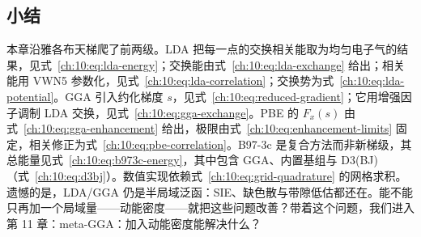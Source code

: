 \subsection*{小结}
本章沿雅各布天梯爬了前两级。LDA 把每一点的交换相关能取为均匀电子气的结果，见式~\eqref{ch:10:eq:lda-energy}；交换能由式~\eqref{ch:10:eq:lda-exchange} 给出；相关能用 VWN5 参数化，见式~\eqref{ch:10:eq:lda-correlation}；交换势为式~\eqref{ch:10:eq:lda-potential}。GGA 引入约化梯度 $s$，见式~\eqref{ch:10:eq:reduced-gradient}；它用增强因子调制 LDA 交换，见式~\eqref{ch:10:eq:gga-exchange}。PBE 的 $F_x(s)$ 由式~\eqref{ch:10:eq:gga-enhancement} 给出，极限由式~\eqref{ch:10:eq:enhancement-limits} 固定，相关修正为式~\eqref{ch:10:eq:pbe-correlation}。B97-3c 是复合方法而非新梯级，其总能量见式~\eqref{ch:10:eq:b973c-energy}，其中包含 GGA、内置基组与 D3(BJ)（式~\eqref{ch:10:eq:d3bj}）。数值实现依赖式~\eqref{ch:10:eq:grid-quadrature} 的网格求积。遗憾的是，LDA/GGA 仍是半局域泛函：SIE、缺色散与带隙低估都还在。能不能只再加一个局域量——动能密度——就把这些问题改善？带着这个问题，我们进入第 11 章：meta-GGA：加入动能密度能解决什么？
